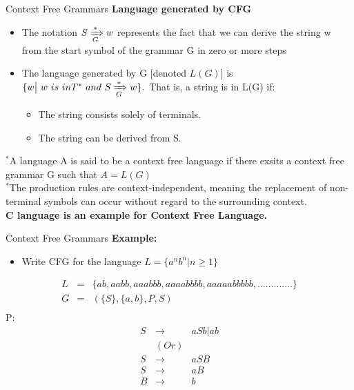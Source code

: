 \documentclass{beamer}
\begin{document}
\begin{frame}{Context Free Grammars}
	\textbf{Language generated by CFG}
	\begin{itemize}
		\item The notation $S \xRightarrow[G]{*}w$ represents the fact that we can derive the string w from the start symbol of the grammar G in zero or more steps
		\item 	The language generated by G [denoted $L(G)$]  is $\{w \big|\  w\  is\  in T^*\  and \ S \xRightarrow[G]{*}w \}.$
		That is, a string is in L(G) if:
		\begin{itemize}
			\item The string consists solely of terminals.
			\item The string can be derived from S.
		\end{itemize}
	\end{itemize}

	$^*$A language  A is said to be a context free language if there exsits a context free grammar G such that $A=L(G)$\\
	$^*$The production rules are context-independent, meaning the replacement of non-terminal symbols can occur without regard to the surrounding context.\\
	\textbf{C language is an example for Context Free Language.}
\end{frame}
\begin{frame}{Context Free Grammars}
	\textbf{Example:}
	\begin{itemize}
		\item Write CFG for the language $ L= \{a^n b^n \big| n\geq1\}$
	\end{itemize}
\begin{eqnarray*}
	L&=& \{ab, aabb, aaabbb, aaaabbbb, aaaaabbbbb, ………….\}\\
	G &=& (\{S\}, \{a, b\}, P, S)
\\
\end{eqnarray*}
P:
\begin{eqnarray*}
	 S &\rightarrow& aSb \big| ab\\
	&(Or)&\\
	S &\rightarrow& aSB\\
	S &\rightarrow& aB\\
	B &\rightarrow& b\\
\end{eqnarray*}
\end{frame}
\end{document}
